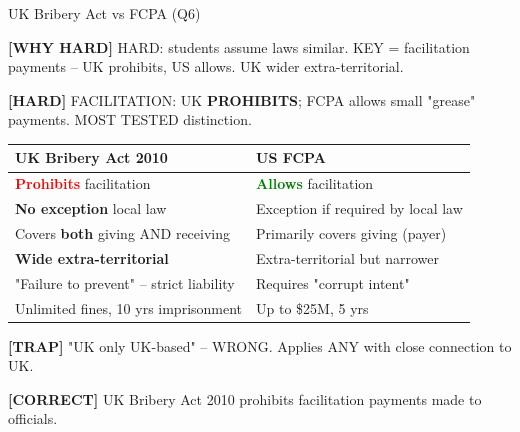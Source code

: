 \documentclass[6pt,aspectratio=169,fontsize=5pt]{beamer}
\renewcommand{\tiny}{\fontsize{3.5pt}{4.5pt}\selectfont}
\renewcommand{\normalsize}{\fontsize{7.5pt}{8.5pt}\selectfont}
\newcommand{\trap}[1]{%
	\begin{block}{\textcolor{redtrap}{\textbf{[TRAP]}}}
		\textcolor{redtrap}{\tiny #1}
	\end{block}
}
\newcommand{\correct}[1]{%
	\begin{block}{\textcolor{greencorrect}{\textbf{[CORRECT]}}}
		\textcolor{greencorrect}{\tiny #1}
	\end{block}
}
\newcommand{\hard}[1]{%
	\begin{block}{\textcolor{hardcolor}{\textbf{[HARD]}}}
		\textcolor{hardcolor}{\tiny #1}
	\end{block}
}
\newcommand{\hardexplain}[1]{%
	\begin{block}{\textcolor{orangehard}{\textbf{[WHY HARD]}}}
		\textcolor{orangehard}{\tiny #1}
	\end{block}
}
\begin{document}
	\begin{frame}{\normalsize UK Bribery Act vs FCPA (Q6)}
		
		\hardexplain{HARD: students assume laws similar. KEY = facilitation payments -- UK prohibits, US allows. UK wider extra-territorial.}
		
		\hard{FACILITATION: UK \textbf{PROHIBITS}; FCPA allows small "grease" payments. MOST TESTED distinction.}
		
		\begin{table}
			\begin{tabular}{|p{3.8cm}|p{3.8cm}|}
				\hline
				\textbf{UK Bribery Act 2010} & \textbf{US FCPA} \\
				\hline
				\textcolor{red}{\textbf{Prohibits}} facilitation & \textcolor{green}{\textbf{Allows}} facilitation \\
				\hline
				\textbf{No exception} local law & Exception if required by local law \\
				\hline
				Covers \textbf{both} giving AND receiving & Primarily covers giving (payer) \\
				\hline
				\textbf{Wide extra-territorial} & Extra-territorial but narrower \\
				\hline
				"Failure to prevent" -- strict liability & Requires "corrupt intent" \\
				\hline
				Unlimited fines, 10 yrs imprisonment & Up to \$25M, 5 yrs \\
				\hline
			\end{tabular}
		\end{table}
		
		\trap{"UK only UK-based" -- WRONG. Applies ANY with close connection to UK.}
		
		\correct{UK Bribery Act 2010 prohibits facilitation payments made to officials.}
	\end{frame}
	
\end{document}

